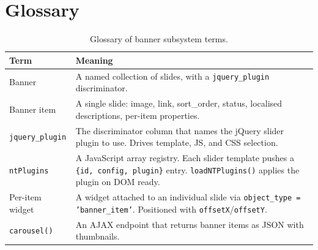 \documentclass[11pt,a4paper]{article}
\begin{document}
\appendix
\section{Glossary}\label{app:glossary}
\begin{table}[htbp]
\centering
\caption{Glossary of banner subsystem terms.}\label{tab:glossary-v9}
\footnotesize\sloppy
\begin{tabularx}{\columnwidth}{>{\raggedright\arraybackslash}p{3.5cm}X}
\toprule
\textbf{Term} & \textbf{Meaning} \\
\midrule
Banner & A named collection of slides, with a \texttt{jquery\_plugin} discriminator. \\
Banner item & A single slide: image, link, sort\_order, status, localised descriptions, per-item properties. \\
\texttt{jquery\_plugin} & The discriminator column that names the jQuery slider plugin to use. Drives template, JS, and CSS selection. \\
\texttt{ntPlugins} & A JavaScript array registry. Each slider template pushes a \texttt{\{id, config, plugin\}} entry. \texttt{loadNTPlugins()} applies the plugin on DOM ready. \\
Per-item widget & A widget attached to an individual slide via \texttt{object\_type = 'banner\_item'}. Positioned with \texttt{offsetX}/\texttt{offsetY}. \\
\texttt{carousel()} & An AJAX endpoint that returns banner items as JSON with thumbnails. \\
\bottomrule
\end{tabularx}
\end{table}
\end{document}
